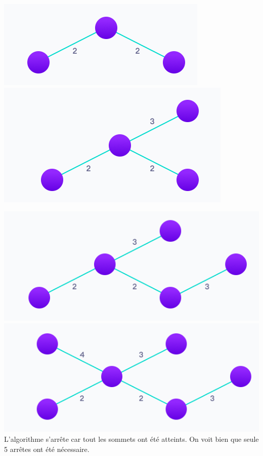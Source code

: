 \begin{Exercice}[5 minutes]
\begin{solution}
        \includegraphics[]{Week 7/K2.PNG}\\
        \includegraphics[]{Week 7/K3.PNG}\\
    \end{solution}
    \begin{solution}
        \includegraphics[]{Week 7/K4.PNG}\\
        \includegraphics[]{Week 7/K5.PNG}\\
        L'algorithme s'arrête car tout les sommets ont été atteints. On voit bien que seule 5 arrêtes ont été nécessaire.
    \end{solution}
\end{Exercice}
